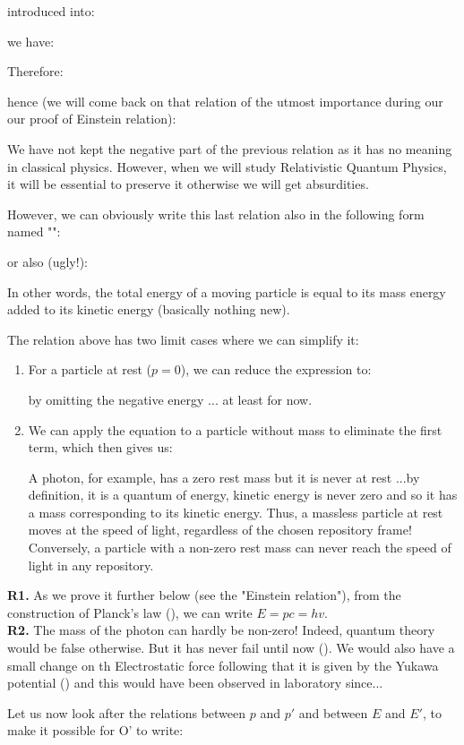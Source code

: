 	introduced into:
	
	we have:
	
	Therefore:
	
	hence (we will come back on that relation of the utmost importance during our our proof of Einstein relation):
	
	We have not kept the negative part of the previous relation as it has no meaning in classical physics. However, when we will study Relativistic Quantum Physics, it will be essential to preserve it otherwise we will get absurdities.

	However, we can obviously write this last relation also in the following form named "":
	
	or also (ugly!):
	
	In other words, the total energy of a moving particle is equal to its mass energy added to its kinetic energy (basically nothing new).
	
	The relation above has two limit cases where we can simplify it:
	\begin{enumerate}
		\item For a particle at rest ($p = 0$), we can reduce the expression to:
		
		by omitting the negative energy ... at least for now.

		\item We can apply the equation to a particle without mass to eliminate the first term, which then gives us:
		
		A photon, for example, has a zero rest mass but it is never at rest ...by definition, it is a quantum of energy, kinetic energy is never zero and so it has a mass corresponding to its kinetic energy. Thus, a massless particle at rest moves at the speed of light, regardless of the chosen repository frame! Conversely, a particle with a non-zero rest mass can never reach the speed of light in any repository.
	\end{enumerate}
	\begin{tcolorbox}[title=Remarks,colframe=black,arc=10pt]
	\textbf{R1.} As we prove it further below (see the "Einstein relation"), from the construction of Planck's law (), we can write $E=pc=hv$.\\
	
	\textbf{R2.} The mass of the photon can hardly be non-zero! Indeed, quantum theory would be false otherwise. But it has never fail until now (). We would also have a small change on th Electrostatic force following that it is given by the Yukawa potential () and this would have been observed in laboratory since...
	\end{tcolorbox}
	Let us now look after the relations between $p$ and $p'$ and between $E$ and $E'$, to make it possible for O' to write:
	
